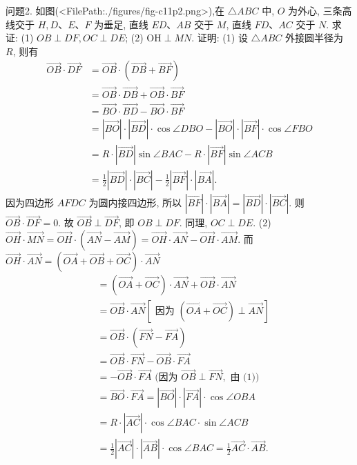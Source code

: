 问题2. 如图(<FilePath:./figures/fig-c11p2.png>),在 $\triangle A B C$ 中, $O$ 为外心, 三条高线交于 $H, D 、 E 、 F$ 为垂足, 直线 $E D 、 A B$ 交于 $M$, 直线 $F D 、 A C$ 交于 $N$. 求证:
(1) $O B \perp D F, O C \perp D E$;
(2) $\mathrm{OH} \perp M N$.
证明: (1) 设 $\triangle A B C$ 外接圆半径为 $R$, 则有
$$
\begin{aligned}
\overrightarrow{O B} \cdot \overrightarrow{D F} & =\overrightarrow{O B} \cdot(\overrightarrow{D B}+\overrightarrow{B F}) \\
& =\overrightarrow{O B} \cdot \overrightarrow{D B}+\overrightarrow{O B} \cdot \overrightarrow{B F} \\
& =\overrightarrow{B O} \cdot \overrightarrow{B D}-\overrightarrow{B O} \cdot \overrightarrow{B F} \\
& =|\overrightarrow{B O}| \cdot|\overrightarrow{B D}| \cdot \cos \angle D B O-|\overrightarrow{B O}| \cdot|\overrightarrow{B F}| \cdot \cos \angle F B O \\
& =R \cdot|\overrightarrow{B D}| \sin \angle B A C-R \cdot|\overrightarrow{B F}| \sin \angle A C B \\
& =\frac{1}{2}|\overrightarrow{B D}| \cdot|\overrightarrow{B C}|-\frac{1}{2}|\overrightarrow{B F}| \cdot|\overrightarrow{B A}| .
\end{aligned}
$$
因为四边形 $A F D C$ 为圆内接四边形, 所以 $|\overrightarrow{B F}| \cdot|\overrightarrow{B A}|=|\overrightarrow{B D}| \cdot|\overrightarrow{B C}|$.
则 $\overrightarrow{O B} \cdot \overrightarrow{D F}=0$.
故 $\overrightarrow{O B} \perp \overrightarrow{D F}$, 即 $O B \perp D F$.
同理, $O C \perp D E$.
(2) $\overrightarrow{O H} \cdot \overrightarrow{M N}=\overrightarrow{O H} \cdot(\overrightarrow{A N}-\overrightarrow{A M})=\overrightarrow{O H} \cdot \overrightarrow{A N}-\overrightarrow{O H} \cdot \overrightarrow{A M}$.
而 $\overrightarrow{O H} \cdot \overrightarrow{A N}=(\overrightarrow{O A}+\overrightarrow{O B}+\overrightarrow{O C}) \cdot \overrightarrow{A N}$
$$
\begin{aligned}
& =(\overrightarrow{O A}+\overrightarrow{O C}) \cdot \overrightarrow{A N}+\overrightarrow{O B} \cdot \overrightarrow{A N} \\
& =\overrightarrow{O B} \cdot \overrightarrow{A N}[\text { 因为 }(\overrightarrow{O A}+\overrightarrow{O C}) \perp \overrightarrow{A N}] \\
& =\overrightarrow{O B} \cdot(\overrightarrow{F N}-\overrightarrow{F A}) \\
& =\overrightarrow{O B} \cdot \overrightarrow{F N}-\overrightarrow{O B} \cdot \overrightarrow{F A} \\
& =-\overrightarrow{O B} \cdot \overrightarrow{F A} \text { (因为 } \overrightarrow{O B} \perp \overrightarrow{F N}, \text { 由 (1)) } \\
& =\overrightarrow{B O} \cdot \overrightarrow{F A}=|\overrightarrow{B O}| \cdot|\overrightarrow{F A}| \cdot \cos \angle O B A \\
& =R \cdot|\overrightarrow{A C}| \cdot \cos \angle B A C \cdot \sin \angle A C B \\
& =\frac{1}{2}|\overrightarrow{A C}| \cdot|\overrightarrow{A B}| \cdot \cos \angle B A C=\frac{1}{2} \overrightarrow{A C} \cdot \overrightarrow{A B} .
\end{aligned}
$$

